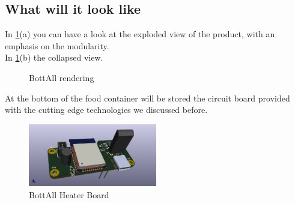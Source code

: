 \subsection{What will it look like}
In \cref{fig:rendering}(a) you can have a look at the exploded view of the product, with an emphasis on the modularity.\\
In \cref{fig:rendering}(b) the collapsed view.
\begin{figure}[H]
    \centering
    \qquad
    \caption{BottAll rendering}%
    \label{fig:rendering}
\end{figure}

At the bottom of the food container will be stored the circuit board provided with the cutting edge technologies we discussed before.
\begin{figure}[H]
\centering
\includegraphics[width=0.5\textwidth]{images/circuito-scalda-vivande2.png}
\caption{BottAll Heater Board}
\end{figure}
